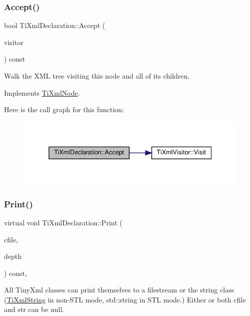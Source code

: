 \subsubsection{\texorpdfstring{Accept()}{Accept()}}
{\footnotesize\ttfamily bool Ti\+Xml\+Declaration\+::\+Accept (\begin{DoxyParamCaption}\item[{\hyperlink{classTiXmlVisitor}{Ti\+Xml\+Visitor} $\ast$}]{visitor }\end{DoxyParamCaption}) const\hspace{0.3cm}{\ttfamily [virtual]}}

Walk the X\+ML tree visiting this node and all of its children. 

Implements \hyperlink{classTiXmlNode_acc0f88b7462c6cb73809d410a4f5bb86}{Ti\+Xml\+Node}.

Here is the call graph for this function\+:
\nopagebreak
\begin{figure}[H]
\begin{center}
\leavevmode
\includegraphics[width=339pt]{classTiXmlDeclaration_aa1b6bade6c989407ce9881bdfc73c1e6_cgraph}
\end{center}
\end{figure}
\mbox{\label{classTiXmlDeclaration_ae46cff6565f299210ab945e78bf28514}} 
\subsubsection{\texorpdfstring{Print()}{Print()}}
{\footnotesize\ttfamily virtual void Ti\+Xml\+Declaration\+::\+Print (\begin{DoxyParamCaption}\item[{F\+I\+LE $\ast$}]{cfile,  }\item[{int}]{depth }\end{DoxyParamCaption}) const\hspace{0.3cm}{\ttfamily [inline]}, {\ttfamily [virtual]}}

All Tiny\+Xml classes can print themselves to a filestream or the string class (\hyperlink{classTiXmlString}{Ti\+Xml\+String} in non-\/\+S\+TL mode, std\+::string in S\+TL mode.) Either or both cfile and str can be null.

